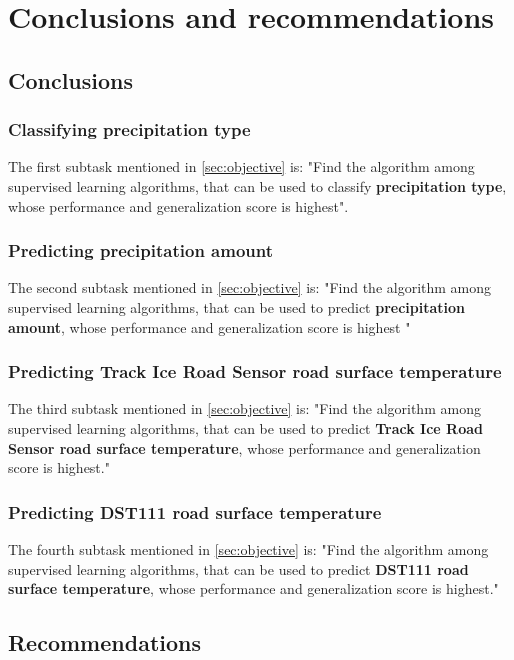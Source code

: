 \chapter{Conclusions and recommendations}

\section{Conclusions}
	\subsection{Classifying precipitation type}
		The first subtask mentioned in \ref{sec:objective} is:
	"Find the algorithm among supervised learning algorithms, that can be used to classify \textbf{precipitation type}, whose performance and generalization score is highest".

	\subsection{Predicting precipitation amount}
		The second subtask mentioned in \ref{sec:objective} is:
	"Find the algorithm among supervised learning algorithms, that can be used to predict \textbf{precipitation amount}, whose performance and generalization score is highest "

	\subsection{Predicting Track Ice Road Sensor road surface temperature}
		The third subtask mentioned in \ref{sec:objective} is:
	"Find the algorithm among supervised learning algorithms, that can be used to predict \textbf{Track Ice Road Sensor road surface temperature}, whose performance and generalization score is highest."

	\subsection{Predicting DST111 road surface temperature}
		The fourth subtask mentioned in \ref{sec:objective} is:
	"Find the algorithm among supervised learning algorithms, that can be used to predict \textbf{DST111 road surface temperature}, whose performance and generalization score is highest."
\section{Recommendations}
